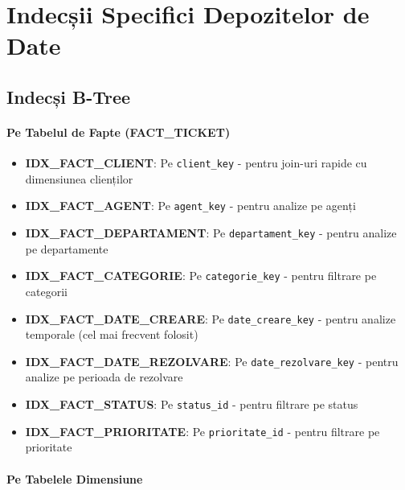 \chapter{Indecșii Specifici Depozitelor de Date}
\label{sec:indecsi}

\section{Indecși B-Tree}

\subsubsection{Pe Tabelul de Fapte (FACT\_TICKET)}

\begin{itemize}
    \item \textbf{IDX\_FACT\_CLIENT}: Pe \texttt{client\_key} - pentru join-uri rapide cu dimensiunea clienților
    \item \textbf{IDX\_FACT\_AGENT}: Pe \texttt{agent\_key} - pentru analize pe agenți
    \item \textbf{IDX\_FACT\_DEPARTAMENT}: Pe \texttt{departament\_key} - pentru analize pe departamente
    \item \textbf{IDX\_FACT\_CATEGORIE}: Pe \texttt{categorie\_key} - pentru filtrare pe categorii
    \item \textbf{IDX\_FACT\_DATE\_CREARE}: Pe \texttt{date\_creare\_key} - pentru analize temporale (cel mai frecvent folosit)
    \item \textbf{IDX\_FACT\_DATE\_REZOLVARE}: Pe \texttt{date\_rezolvare\_key} - pentru analize pe perioada de rezolvare
    \item \textbf{IDX\_FACT\_STATUS}: Pe \texttt{status\_id} - pentru filtrare pe status
    \item \textbf{IDX\_FACT\_PRIORITATE}: Pe \texttt{prioritate\_id} - pentru filtrare pe prioritate
\end{itemize}

\subsubsection{Pe Tabelele Dimensiune}

